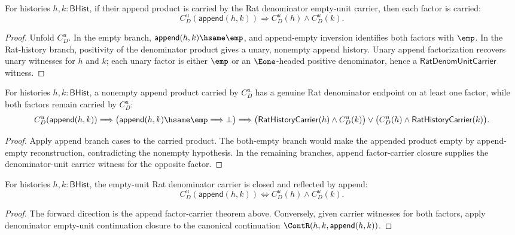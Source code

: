 \begin{theorem}
\label{thm:rat-denom-unit-carrier-append-factor-carriers}
For histories $h,k:\mathsf{BHist}$, if their append product is carried by the
Rat denominator empty-unit carrier, then each factor is carried:
$$
C_D^u(\mathsf{append}(h,k))
\Longrightarrow
C_D^u(h)\wedge C_D^u(k).
$$
\end{theorem}
\begin{proof}
Unfold $C_D^u$. In the empty branch,
$\mathsf{append}(h,k)\hsame\emp$, and append-empty inversion identifies both
factors with $\emp$. In the Rat-history branch, positivity of the denominator
product gives a unary, nonempty append history. Unary append factorization
recovers unary witnesses for $h$ and $k$; each unary factor is either $\emp$
or an $\Eone$-headed positive denominator, hence a
$\mathsf{RatDenomUnitCarrier}$ witness.
\end{proof}

\begin{theorem}
\label{thm:rat-denom-unit-carrier-append-nonempty-factor-cases}
For histories $h,k:\mathsf{BHist}$, a nonempty append product carried by
$C_D^u$ has a genuine Rat denominator endpoint on at least one factor, while
both factors remain carried by $C_D^u$:
$$
C_D^u(\mathsf{append}(h,k))
\Longrightarrow
\bigl(\mathsf{append}(h,k)\hsame\emp\Longrightarrow\bot\bigr)
\Longrightarrow
\bigl(\mathsf{RatHistoryCarrier}(h)\wedge C_D^u(k)\bigr)
\lor
\bigl(C_D^u(h)\wedge\mathsf{RatHistoryCarrier}(k)\bigr).
$$
\end{theorem}
\begin{proof}
Apply append branch cases to the carried product. The both-empty branch would
make the appended product empty by append-empty reconstruction, contradicting
the nonempty hypothesis. In the remaining branches, append factor-carrier
closure supplies the denominator-unit carrier witness for the opposite factor.
\end{proof}

\begin{proposition}
\label{prop:rat-denom-unit-carrier-append-iff}
For histories $h,k:\mathsf{BHist}$, the empty-unit Rat denominator carrier is
closed and reflected by append:
$$
C_D^u(\mathsf{append}(h,k))
\Longleftrightarrow
C_D^u(h)\wedge C_D^u(k).
$$
\end{proposition}
\begin{proof}
The forward direction is the append factor-carrier theorem above. Conversely,
given carrier witnesses for both factors, apply denominator empty-unit
continuation closure to the canonical continuation
$\ContR(h,k,\mathsf{append}(h,k))$.
\end{proof}

